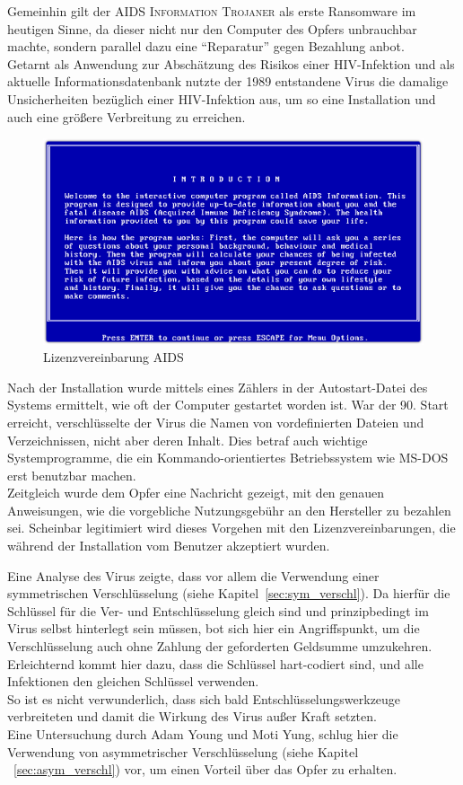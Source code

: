 Gemeinhin gilt der \textsc{AIDS Information Trojaner} als erste Ransomware im heutigen Sinne, da dieser nicht nur den Computer des Opfers unbrauchbar machte, sondern
		parallel dazu eine "`Reparatur"' gegen Bezahlung anbot. \\
		Getarnt als Anwendung zur Abschätzung des Risikos einer HIV-Infektion und als aktuelle Informationsdatenbank nutzte der 1989 entstandene Virus die damalige
		Unsicherheiten bezüglich einer HIV-Infektion aus, um so eine Installation und auch eine größere Verbreitung zu erreichen.
	\begin{figure}[h!]
		\centering
		\includegraphics[width=\linewidth]{img/aids1.png}
		\caption{Lizenzvereinbarung AIDS\cite{aids:sophos}}
		\label{fig:lizenz_aids}
	\end{figure}

		Nach der Installation wurde mittels eines Zählers in der Autostart-Datei des Systems ermittelt, wie oft der Computer gestartet worden ist. War der 90. Start
		erreicht, verschlüsselte der Virus die Namen von vordefinierten Dateien und Verzeichnissen, nicht aber deren Inhalt. Dies betraf auch wichtige Systemprogramme, die
		ein Kommando-orientiertes Betriebssystem wie MS-DOS erst benutzbar machen. \\
		Zeitgleich wurde dem Opfer eine Nachricht gezeigt, mit den genauen Anweisungen, wie die vorgebliche Nutzungsgebühr an den Hersteller zu bezahlen sei.
		Scheinbar legitimiert wird dieses Vorgehen mit den Lizenzvereinbarungen, die während der Installation vom Benutzer akzeptiert wurden.

		Eine Analyse des Virus zeigte, dass vor allem die Verwendung einer symmetrischen Verschlüsselung (siehe Kapitel~\ref{sec:sym_verschl}).
		Da hierfür die Schlüssel für die Ver- und Entschlüsselung gleich sind und prinzipbedingt im Virus selbst hinterlegt sein müssen, bot sich hier ein Angriffspunkt, um die
		Verschlüsselung auch ohne Zahlung der geforderten Geldsumme umzukehren. Erleichternd kommt hier dazu, dass die Schlüssel hart-codiert sind, und alle Infektionen
		den gleichen Schlüssel verwenden. \\
		So ist es nicht verwunderlich, dass sich bald Entschlüsselungswerkzeuge verbreiteten und damit die Wirkung des Virus außer Kraft setzten. \\
		Eine Untersuchung durch Adam Young und Moti Yung, schlug hier die Verwendung von asymmetrischer Verschlüsselung (siehe Kapitel ~\ref{sec:asym_verschl}) vor, um einen
		Vorteil über das Opfer zu erhalten. \cite{aids:young}

